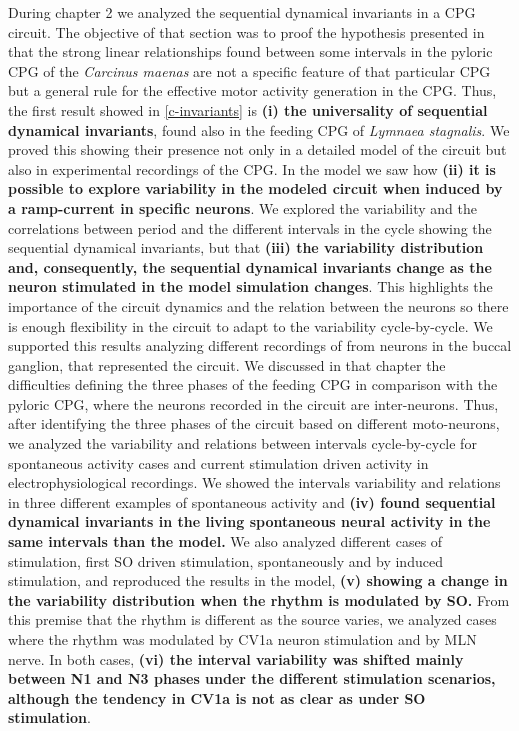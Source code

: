 	
During chapter 2 we analyzed the sequential dynamical invariants in a CPG circuit. The objective of that section was to proof the hypothesis presented in \cite{elices_robust_2019} that the strong linear relationships found between some intervals in the pyloric CPG of the \textit{Carcinus maenas} are not a specific feature of that particular CPG but a general rule for the effective motor activity generation in the CPG. Thus, the first result showed in \ref{c-invariants} is \textbf{(i) the universality of sequential dynamical invariants}, found also in the feeding CPG of \textit{Lymnaea stagnalis}. We proved this showing their presence not only in a detailed model of the circuit but also in experimental recordings of the CPG. In the model we saw how \textbf{(ii) it is possible to explore variability in the modeled circuit when induced by a ramp-current in specific neurons}. We explored the variability and the correlations between period and the different intervals in the cycle showing the sequential dynamical invariants, but that \textbf{(iii) the variability distribution and, consequently, the sequential dynamical invariants change as the neuron stimulated in the model simulation changes}. This highlights the importance of the circuit dynamics and the relation between the neurons so there is enough flexibility in the circuit to adapt to the variability cycle-by-cycle. We supported this results analyzing different recordings of from neurons in the buccal ganglion, that represented the circuit. We discussed in that chapter the difficulties defining the three phases of the feeding CPG in comparison with the pyloric CPG, where the neurons recorded in the circuit are inter-neurons. Thus, after identifying the three phases of the circuit based on different moto-neurons, we analyzed the variability and relations between intervals cycle-by-cycle for spontaneous activity cases and current stimulation driven activity in electrophysiological recordings. We showed the intervals variability and relations in three different examples of spontaneous activity and \textbf{(iv) found sequential dynamical invariants in the living spontaneous neural activity in the same intervals than the model.} We also analyzed different cases of stimulation, first SO driven stimulation, spontaneously and by induced stimulation, and reproduced the results in the model, \textbf{(v) showing a change in the variability distribution when the rhythm is modulated by SO.} From this premise that the rhythm is different as the source varies, we analyzed cases where the rhythm was modulated by CV1a neuron stimulation and by MLN nerve. In both cases, \textbf{(vi) the interval variability was shifted mainly between N1 and N3 phases under the different stimulation scenarios, although the tendency in CV1a is not as clear as under SO stimulation}.

